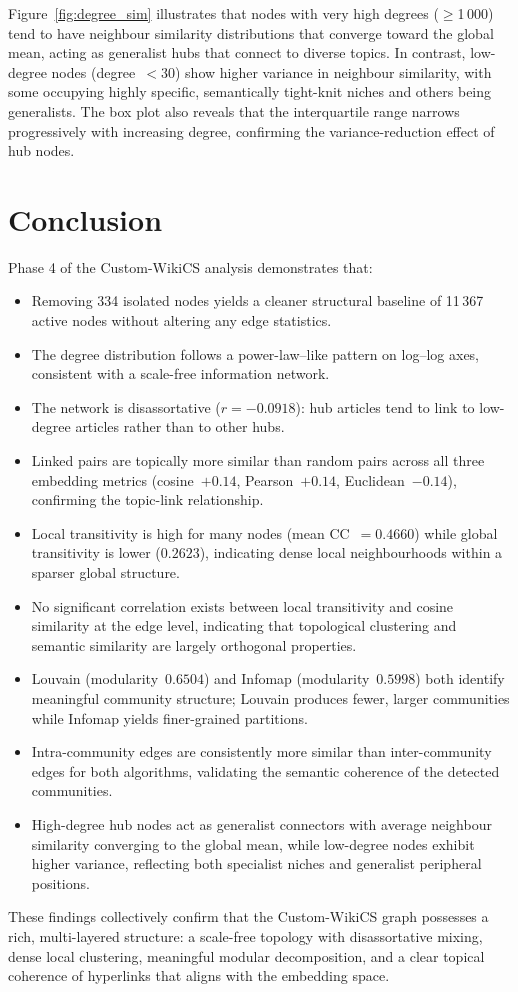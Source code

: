 \documentclass[12pt,a4paper]{article}
\begin{document}
Figure~\ref{fig:degree_sim} illustrates that nodes with very high degrees
($\geq$1\,000) tend to have neighbour similarity distributions that converge
toward the global mean, acting as generalist hubs that connect to diverse topics.
In contrast, low-degree nodes (degree~$<$30) show higher variance in neighbour
similarity, with some occupying highly specific, semantically tight-knit niches
and others being generalists.  The box plot also reveals that the interquartile
range narrows progressively with increasing degree, confirming the
variance-reduction effect of hub nodes.

\section{Conclusion}

Phase 4 of the Custom-WikiCS analysis demonstrates that:

\begin{itemize}
    \item Removing 334 isolated nodes yields a cleaner structural baseline of
          11\,367 active nodes without altering any edge statistics.
    \item The degree distribution follows a power-law--like pattern on log--log
          axes, consistent with a scale-free information network.
    \item The network is disassortative ($r=-0.0918$): hub articles tend to link
          to low-degree articles rather than to other hubs.
    \item Linked pairs are topically more similar than random pairs across all
          three embedding metrics (cosine~$+0.14$, Pearson~$+0.14$,
          Euclidean~$-0.14$), confirming the topic-link relationship.
    \item Local transitivity is high for many nodes (mean CC~$=0.4660$) while
          global transitivity is lower ($0.2623$), indicating dense local
          neighbourhoods within a sparser global structure.
    \item No significant correlation exists between local transitivity and
          cosine similarity at the edge level, indicating that topological
          clustering and semantic similarity are largely orthogonal properties.
    \item Louvain (modularity~$0.6504$) and Infomap (modularity~$0.5998$) both
          identify meaningful community structure; Louvain produces fewer,
          larger communities while Infomap yields finer-grained partitions.
    \item Intra-community edges are consistently more similar than
          inter-community edges for both algorithms, validating the semantic
          coherence of the detected communities.
    \item High-degree hub nodes act as generalist connectors with average
          neighbour similarity converging to the global mean, while low-degree
          nodes exhibit higher variance, reflecting both specialist niches and
          generalist peripheral positions.
\end{itemize}

These findings collectively confirm that the Custom-WikiCS graph possesses a
rich, multi-layered structure: a scale-free topology with disassortative mixing,
dense local clustering, meaningful modular decomposition, and a clear
topical coherence of hyperlinks that aligns with the embedding space.
\end{document}
